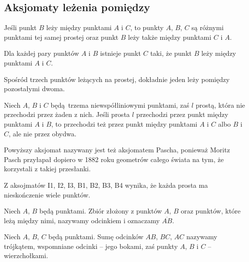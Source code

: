 %

\subsection{Aksjomaty leżenia pomiędzy}
\begin{axiom}
    Jeśli punkt $B$ leży między punktami $A$ i $C$, to punkty $A$, $B$, $C$ są różnymi punktami tej samej prostej oraz punkt $B$ leży także między punktami $C$ i $A$.
\end{axiom}

\begin{axiom}
    Dla każdej pary punktów $A$ i $B$ istnieje punkt $C$ taki, że punkt $B$ leży między punktami $A$ i $C$.
\end{axiom}

\begin{axiom}
    Spośród trzech punktów leżących na prostej, dokładnie jeden leży pomiędzy pozostałymi dwoma.
\end{axiom}

\begin{axiom}
    Niech $A$, $B$ i $C$ będą trzema niewspółliniowymi punktami, zaś $l$ prostą, która nie przechodzi przez żaden z nich.
    Jeśli prosta $l$ przechodzi przez punkt między punktami $A$ i $B$, to przechodzi też przez punkt między punktami $A$ i $C$ albo $B$ i $C$, ale nie przez obydwa.
\end{axiom}

Powyższy aksjomat nazywany jest też aksjomatem Pascha, ponieważ Moritz Pasch \cite{pasch_1882} przyłapał dopiero w 1882 roku geometrów całego świata na tym, że korzystali z takiej przesłanki.
%
%

\begin{proposition}
    Z aksojmatów I1, I2, I3, B1, B2, B3, B4 wynika, że każda prosta ma nieskończenie wiele punktów.
\end{proposition}

\begin{definition}[odcinek]
    Niech $A$, $B$ będą punktami.
    Zbiór złożony z punktów $A$, $B$ oraz punktów, które leżą między nimi, nazywamy odcinkiem i oznaczamy $\overline {AB}$.
\end{definition} %

\begin{definition}[trójkąt]
    Niech $A$, $B$, $C$ będą punktami.
    Sumę odcinków $AB$, $BC$, $AC$ nazywamy trójkątem, wspomniane odcinki -- jego bokami, zaś punkty $A$, $B$ i $C$ -- wierzchołkami.
\end{definition} %

